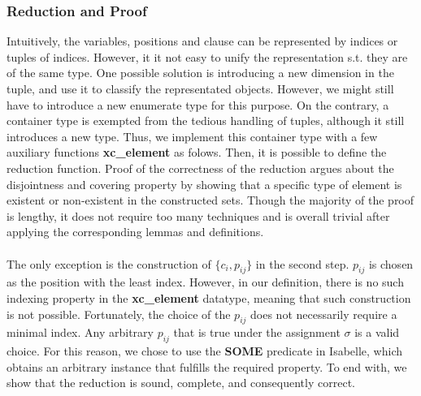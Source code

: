 \subsubsection{Reduction and Proof}
Intuitively, the variables, positions and clause can be represented by indices or tuples of indices. However, it it not easy 
to unify the representation s.t. they are of the same type. One possible solution is introducing a new dimension in the tuple, 
and use it to classify the representated objects. However, we might still have to introduce a new enumerate type for this purpose. 
On the contrary, a container type is exempted from the tedious handling of tuples, although it still introduces a new type. Thus, 
we implement this container type with a few auxiliary functions \textbf{xc\_element} as folows. 
Then, it is possible to define the reduction function. 
Proof of the correctness of the reduction argues about the disjointness and covering property by showing that a specific type of element 
is existent or non-existent in the constructed sets. Though the majority of the proof is lengthy, it does not require too many techniques 
and is overall trivial after applying the corresponding lemmas and definitions.\\\\
The only exception is the construction of $\{c_i, p_{ij}\}$ in the second step. $p_{ij}$ is chosen as the position with the least index. However, 
in our definition, there is no such indexing property in the \textbf{xc\_element} datatype, meaning that such construction is not possible. 
Fortunately, the choice of the $p_{ij}$ does not necessarily require a minimal index. Any arbitrary $p_{ij}$ that is true under the assignment 
$\sigma$ is a valid choice. For this reason, we chose to use the \textbf{SOME} predicate in Isabelle, which obtains an arbitrary instance that fulfills
the required property. 
To end with, we show that the reduction is sound, complete, and consequently correct. 

